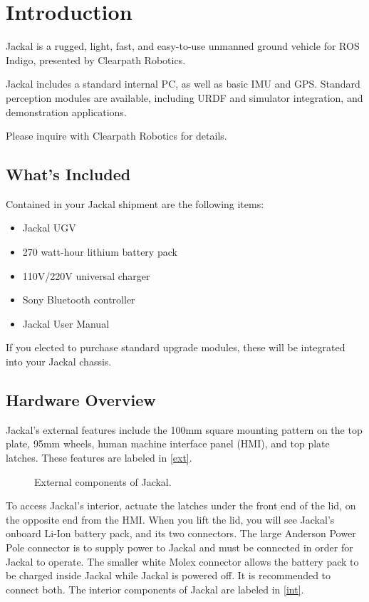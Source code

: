 \documentclass[]{clearpath-manual}
\begin{document}
\tableofcontents

\section{Introduction}

Jackal is a rugged, light, fast, and easy-to-use unmanned ground vehicle for ROS
Indigo, presented by Clearpath Robotics.

Jackal includes a standard internal PC, as well as basic IMU and GPS. Standard
perception modules are available, including URDF and simulator integration, and
demonstration applications.

Please inquire with Clearpath Robotics for details.

\subsection{What's Included}

Contained in your Jackal shipment are the following items:

\begin{itemize}
  \item Jackal UGV
  \item 270 watt-hour lithium battery pack
  \item 110V/220V universal charger
  \item Sony Bluetooth controller
  \item Jackal User Manual
\end{itemize}

If you elected to purchase standard upgrade modules, these will be integrated into your Jackal chassis.

\subsection{Hardware Overview}

Jackal's external features include the 100mm square mounting pattern on the top plate, 95mm wheels, human
machine interface panel (HMI), and top plate latches. These features are labeled in \autoref{ext}.

\begin{figure}[ht]
  \centering
  \placeholder{9cm}{5cm}
  \caption{External components of Jackal.}
  \label{ext}
\end{figure}

To access Jackal's interior, actuate the latches under the front end of the lid, on the opposite end from
the HMI. When you lift the lid, you will see Jackal's onboard Li-Ion battery pack, and its two connectors.
The large Anderson Power Pole connector is to supply power to Jackal and must be connected in order for
Jackal to operate. The smaller white Molex connector allows the battery pack to be charged inside Jackal 
while Jackal is powered off. It is recommended to connect both. The interior components of Jackal are
labeled in \autoref{int}.
\end{document}
